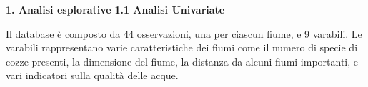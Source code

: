 \documentclass{article} %
\begin{document}
\onehalfspacing


\newpage



\newpage
\begin{flushleft}
    \textbf{\Huge 1. \: Analisi esplorative}
    \vskip 30pt
    \textbf{\Large 1.1 \: Analisi Univariate}
\end{flushleft}
\vskip 10pt

Il database è composto da 44 osservazioni, una per ciascun fiume, e 9 varabili. Le varabili rappresentano varie caratteristiche dei fiumi come il numero di specie di cozze presenti, la dimensione del fiume, la distanza da alcuni fiumi importanti, e vari indicatori sulla qualità delle acque.\\
\end{document}
